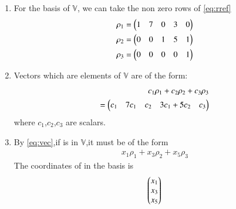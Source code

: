 \documentclass[journal,12pt,twocolumn]{IEEEtran}
\begin{document}
\begin{enumerate}[label=\alph*.]
\item For the basis of $\mathbb{V}$, we can take the non zero rows of \eqref{eq:rref} \\
\begin{align}
    \rho_1=\begin{pmatrix}1&7&0&3&0\end{pmatrix} \\
    \rho_2=\begin{pmatrix}0&0&1&5&1\end{pmatrix}\\
    \rho_3=\begin{pmatrix}0&0&0&0&1\end{pmatrix}
\end{align}
\item Vectors which are elements of $\mathbb{V}$  are of the form:
\begin{align}
    c_1\rho_1+c_2\rho_2+c_3\rho_3 \nonumber\\
    =\begin{pmatrix}c_1&7c_1&c_2&3c_1+5c_2&c_3\end{pmatrix} \label{eq:vec}
\end{align}
where $c_1$,$c_2$,$c_3$ are scalars.
\item By \eqref{eq:vec},if  is in $\mathbb{V}$,it must be of the form
\begin{align}
    x_1\rho_1+x_3\rho_2+x_5\rho_3
\end{align}
The coordinates of  in the  basis is
\begin{align}
    \begin{pmatrix}x_1\\x_3\\x_5\end{pmatrix}
\end{align}
\end{enumerate}
\end{document}
